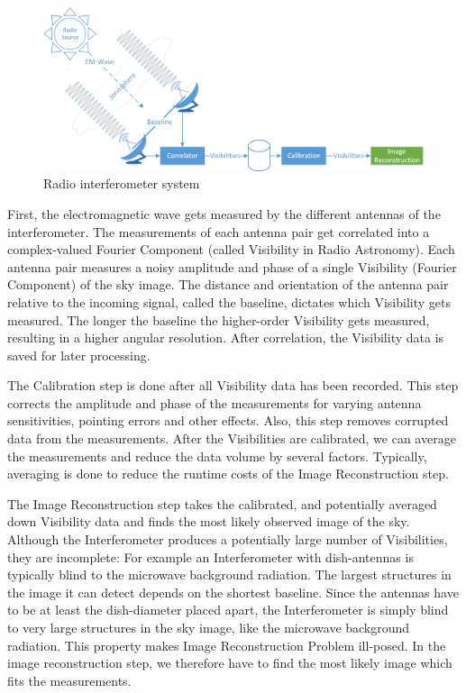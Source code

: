 \begin{figure}[h]
	\centering
	\includegraphics[width=0.80\linewidth]{./chapters/01.intro/system.png}
	\caption{Radio interferometer system}
	\label{intro:system}
\end{figure}

First, the electromagnetic wave gets measured by the different antennas of the interferometer. The measurements of each antenna pair get correlated into a complex-valued Fourier Component (called Visibility in Radio Astronomy). Each antenna pair measures a noisy amplitude and phase of a single Visibility (Fourier Component) of the sky image. The distance and orientation of the antenna pair relative to the incoming signal, called the baseline, dictates which Visibility gets measured. The longer the baseline the higher-order Visibility gets measured, resulting in a higher angular resolution. After correlation, the Visibility data is saved for later processing.

The Calibration step is done after all Visibility data has been recorded. This step corrects the amplitude and phase of the measurements for varying antenna sensitivities, pointing errors and other effects. Also, this step removes corrupted data from the measurements. After the Visibilities are calibrated, we can average the measurements and reduce the data volume by several factors. Typically, averaging is done to reduce the runtime costs of the Image Reconstruction step.

The Image Reconstruction step takes the calibrated, and potentially averaged down Visibility data and finds the most likely observed image of the sky. Although the Interferometer produces a potentially large number of Visibilities, they are incomplete: For example an Interferometer with dish-antennas is typically blind to the microwave background radiation. The largest structures in the image it can detect depends on the shortest baseline. Since the antennas have to be at least the dish-diameter placed apart, the Interferometer is simply blind to very large structures in the sky image, like the microwave background radiation. This property makes Image Reconstruction Problem ill-posed. In the image reconstruction step, we therefore have to find the most likely image which fits the measurements.

